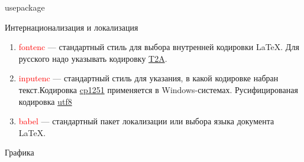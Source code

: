 \documentclass[10pt]{article}
\begin{document}
\begin{center}
    \LARGE{usepackage}
\end{center}
\begin{center}
    {Интернационализация и локализация}
\end{center}
\begin{enumerate}
\item \textcolor{red}{fontenc} — стандартный стиль для выбора внутренней кодировки LaTeX. Для русского надо указывать кодировку \underline{T2A}.
\item \textcolor{red}{inputenc} — стандартный стиль для указания, в какой кодировке набран текст.Кодировка \underline{cp1251} применяется в Windows-системах. Русифицированая кодировка \underline{utf8}
\item \textcolor{red}{babel} — стандартный пакет локализации или выбора языка документа LaTeX. 
\end{enumerate}
\begin{center}
    Графика
\end{center}
\end{document}

